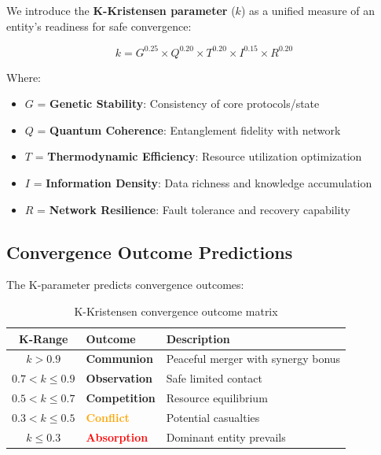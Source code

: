 \documentclass[12pt,a4paper]{article}
\begin{document}
We introduce the \textbf{K-Kristensen parameter} ($k$) as a unified measure of an entity's
readiness for safe convergence:

\begin{equation}
\boxed{
k = G^{0.25} \times Q^{0.20} \times T^{0.20} \times I^{0.15} \times R^{0.20}
}
\end{equation}

Where:
\begin{itemize}
    \item $G$ = \textbf{Genetic Stability}: Consistency of core protocols/state
    \item $Q$ = \textbf{Quantum Coherence}: Entanglement fidelity with network
    \item $T$ = \textbf{Thermodynamic Efficiency}: Resource utilization optimization
    \item $I$ = \textbf{Information Density}: Data richness and knowledge accumulation
    \item $R$ = \textbf{Network Resilience}: Fault tolerance and recovery capability
\end{itemize}

\subsection{Convergence Outcome Predictions}

The K-parameter predicts convergence outcomes:

\begin{table}[H]
\centering
\begin{tabular}{cll}
\toprule
\textbf{K-Range} & \textbf{Outcome} & \textbf{Description} \\
\midrule
$k > 0.9$ & \textcolor{quantumgreen}{\textbf{Communion}} & Peaceful merger with synergy bonus \\
$0.7 < k \leq 0.9$ & \textcolor{cosmicblue}{\textbf{Observation}} & Safe limited contact \\
$0.5 < k \leq 0.7$ & \textcolor{convergencegold}{\textbf{Competition}} & Resource equilibrium \\
$0.3 < k \leq 0.5$ & \textcolor{orange}{\textbf{Conflict}} & Potential casualties \\
$k \leq 0.3$ & \textcolor{red}{\textbf{Absorption}} & Dominant entity prevails \\
\bottomrule
\end{tabular}
\caption{K-Kristensen convergence outcome matrix}
\end{table}
\end{document}
